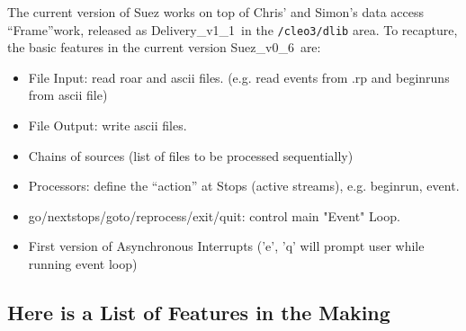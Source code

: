 \documentclass[12pt]{article}
\def\SuezVersion{Suez\_v0\_6}
\def\DeliveryVersion{Delivery\_v1\_1}
\begin{document}
The current version of Suez works on top of Chris' and Simon's data
access ``Frame''work, released as \DeliveryVersion\ in the
\texttt{/cleo3/dlib} area.  To recapture, the basic features in the current
version \SuezVersion\ are:
\begin{itemize}

\item File Input: read roar and ascii files. 
      (e.g. read events from .rp and beginruns from ascii file)

\item File Output: write ascii files. 

\item Chains of sources (list of files to be processed sequentially)

\item Processors: define the ``action'' at Stops (active streams), 
      e.g. beginrun, event. 

\item go/nextstops/goto/reprocess/exit/quit: control main "Event" Loop.

\item First version of Asynchronous Interrupts ('e', 'q' will prompt
      user while running event loop)

\end{itemize}


\subsection{Here is a List of Features in the Making}
\label{sec:FutureFeatures}
\end{document}
